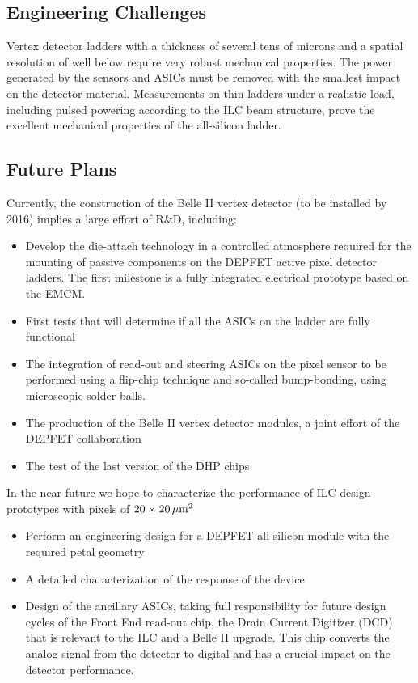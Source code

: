\subsection{Engineering Challenges}
Vertex detector ladders with a thickness of several tens of microns and a spatial resolution of well below \unit[10]{\micron} require very robust mechanical properties. The power generated by the sensors and ASICs must be removed with the smallest impact on the detector material.
Measurements on thin ladders under a realistic load, including pulsed powering according to the ILC beam structure, prove  the excellent mechanical properties of the all-silicon ladder.

\subsection{Future Plans}
Currently, the construction of the Belle II vertex detector (to be installed by 2016) implies a large effort of R\&D, including:
\begin{itemize}
\item Develop the die-attach technology in a controlled atmosphere required for the mounting of passive components on the DEPFET active pixel detector ladders. The first milestone is a fully integrated electrical prototype based on the EMCM.
\item First tests that will determine if all the ASICs on the ladder are fully functional
\item The integration of read-out and steering ASICs on the pixel sensor to be performed using a flip-chip technique and so-called bump-bonding, using microscopic solder balls.
\item The production of the Belle II vertex detector modules, a joint effort of the DEPFET collaboration
\item The test of the last version of the DHP chips
\end{itemize}
In the near future we hope to characterize the performance of ILC-design prototypes with
pixels of $20 \times \unit[20]{\micron^2}$
\begin{itemize}
\item Perform an engineering design for a DEPFET all-silicon module with the required petal geometry
\item A detailed characterization of the response of the device
\item Design of the ancillary ASICs, taking full responsibility for future design cycles of the Front End read-out chip, the Drain Current Digitizer (DCD) that is relevant to the ILC and a Belle II upgrade. This chip converts the analog signal from the detector to digital and has a crucial impact on the detector performance.
\end{itemize}

